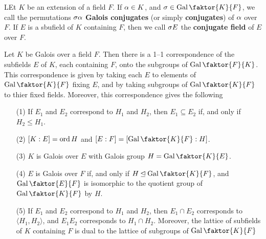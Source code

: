 \begin{definition}
    LEt $K$ be an extension of a field  $F$. If  $\alpha \in K$, and  $\s \in
    \Gal{\faktor{K}{F}}$, we call the permutations $\sigma\alpha$  \textbf{Galois
    conjugates} (or simply \textbf{conjugates}) of $\alpha$ over $F$. If $E$ is a
    sbufield of  $K$ containing  $F$, then we call  $\sigma{E}$ the
    \textbf{conjugate field} of $E$over  $F$.
\end{definition}

\begin{theorem}\label{2.2.4}
    Let $K$ be Galois over a field  $F$. Then there is a 1--1 correspondence of
    the subfields  $E$ of  $K$, each containing $F$, onto the subgroups of
    $\Gal{\faktor{F}{K}}$. This correspondence is given by taking each $E$ to
    elements of $\Gal{\faktor{K}{F}}$ fixing $E$, and by taking subgroups of
    $\Gal{\faktor{K}{F}}$ to thier fixed fields. Moreover, this correspondence
    gives the following
    \begin{enumerate}
        \item[(1)] If $E_1$ and $E_2$ correspond to $H_1$ and $H_2$, then $E_1
            \subseteq E_2$ if, and only if $H_2 \leq H_1$.

        \item[(2)] $[K:E]=\operatorname{ord}{H}$ and $[E:F]=[\Gal{\faktor{K}{F}}:H]$.

        \item[(3)] $K$ is Galois over  $E$ with Galois group $H=\Gal{\faktor{K}{E}}$.

        \item[(4)] $E$ is Galois over  $F$ if, and only if  $H \unlhd
            \Gal{\faktor{K}{F}}$, and $\Gal{\faktor{E}{F}}$ is isomorphic to the
            quotient group of $\Gal{\faktor{K}{F}}$ by $H$.

        \item[(5)] If $E_1$ and $E_2$ correspond to $H_1$ and $H_2$, then $E_1
            \cap E_2$ corresponds to $\langle H_1, H_2 \rangle$, and $E_1E_2$
            corresponds to $H_1 \cap H_2$. Moreover, the lattice of subfields of
            $K$ containing  $F$ is dual to the lattice of subgroups of
            $\Gal{\faktor{K}{F}}$
    \end{enumerate}
\end{theorem}

